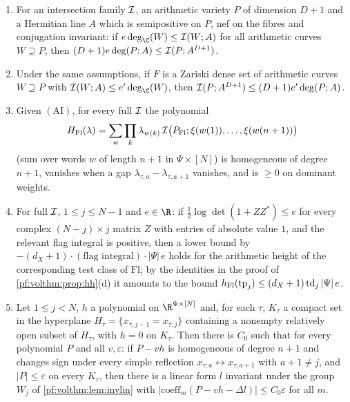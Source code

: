 \begin{definition}\label{pf:volthm:def:inputs}
\begin{enumerate}[label=(\alph*)]
\item[$(\mathrm{Z}^-)$] For an intersection family $\mathcal{I}$, an arithmetic variety $P$ of
  dimension $D+1$ and a Hermitian line $A$ which is semipositive on $P$, nef on the fibres and conjugation
  invariant: if $e\deg_\C(W)\le\volthmII(W;A)$ for all arithmetic curves $W\supseteq P$, then
  $(D+1)e\deg(P;A)\le\mathcal{I}(P;A^{D+1})$.
\item[$(\mathrm{Z}^+)$] Under the same assumptions, if $F$ is a Zariski dense set of
  arithmetic curves $W\supseteq P$ with $\volthmII(W;A)\le e'\deg_\C(W)$, then
  $\mathcal{I}(P;A^{D+1})\le(D+1)e'\deg(P;A)$.
\item[$(\mathrm{FH})$] Given $(\mathrm{AI})$, for every full $\mathcal{I}$ the polynomial
  \[
  H_{\mathrm{Fl}}(\lambda)=\sum_w\prod_k\lambda_{w(k)}\,\mathcal{I}\bigl(P_{\mathrm{Fl}};\xi(w(1)),\dots,\xi(w(n+1))\bigr)
  \]
  (sum over words $w$ of length $n+1$ in $\Psi\times[N]$) is homogeneous of degree $n+1$, vanishes when a gap
  $\lambda_{\tau,a}-\lambda_{\tau,a+1}$ vanishes, and is $\ge0$ on dominant weights.
\item[$(\mathrm{GH})$] For full $\mathcal{I}$, $1\le j\le N-1$ and $e\in\R$: if $\frac12\log\det(1+ZZ^*)\le e$ for
  every complex $(N-j)\times j$ matrix $Z$ with entries of absolute value $1$, and the relevant flag integral is
  positive, then a lower bound by $-(d_X+1)\cdot(\text{flag integral})\cdot|\Psi|\,e$ holds for the arithmetic
  height of the corresponding test class of $\mathrm{Fl}$; by the identities in the proof of
  \cref{pf:volthm:prop:hh}(d) it amounts to the bound $h_{\mathrm{Fl}}(\mathrm{tp}_j)\le(d_X+1)\,\mathrm{td}_j\,|\Psi|\,e$.
\item[$(\mathrm{AP})$] Let $1\le j<N$, $h$ a polynomial on $\R^{\Psi\times[N]}$ and, for each $\tau$, $K_\tau$ a
  compact set in the hyperplane $H_\tau=\{x_{\tau,j-1}=x_{\tau,j}\}$ containing a nonempty relatively open subset of
  $H_\tau$, with $h=0$ on $K_\tau$. Then there is $C_0$ such that for every polynomial $P$ and all $v,\varepsilon$:
  if $P-vh$ is homogeneous of degree $n+1$ and changes sign under every simple reflection
  $x_{\tau,a}\leftrightarrow x_{\tau,a+1}$ with $a+1\ne j$, and $|P|\le\varepsilon$ on every $K_\tau$, then there is
  a linear form $l$ invariant under the group $W_j$ of \cref{pf:volthm:lem:invlin} with
  $|\mathrm{coeff}_m(P-vh-\Delta l)|\le C_0\varepsilon$ for all $m$.
\end{enumerate}
\end{definition}

